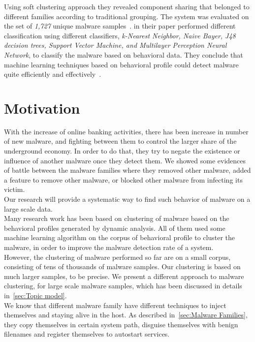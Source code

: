 Using soft clustering approach they revealed component sharing that belonged to different families according to traditional grouping.
The system was evaluated on the set of \emph{1,727} unique malware samples~\cite[]{yavvari}.
\textbf{\citeauthor{firdausi}} in their paper performed different classification using different classifiers, \emph{k-Nearest Neighbor, Naive Bayer, J48 decision trees, Support Vector Machine, and Multilayer Perception Neural Network}, to classify the malware based on behavioral data.
They conclude that machine learning techniques based on behavioral profile could detect malware quite efficiently and effectively~\cite[]{firdausi}.\\
\section{Motivation}
\label{sec:Motivation}
With the increase of online banking activities, there has been increase in number of new malware, and fighting between them to control the larger share of the underground economy.
In order to do that, they try to negate the existence or influence of another malware once they detect them.
We showed some evidences of battle between the malware families where they removed other malware, added a feature to remove other malware, or blocked other malware from infecting its victim.\\
Our research will provide a systematic way to find such behavior of malware on a large scale data.
\\
Many research work has been based on clustering of malware based on the behavioral profiles generated by dynamic analysis.
All of them used some machine learning algorithm on the corpus of behavioral profile to cluster the malware, in order to improve the malware detection rate of a system.\\
However, the clustering of malware performed so far are on a small corpus, consisting of tens of thousands of malware samples.
Our clustering is based on much larger samples, {\gettotalmalwarei{}} to be precise.
We present a different approach to malware clustering, for large scale malware samples, which has been discussed in details in~\autoref{sec:Topic model}.\\
We know that different malware family have different techniques to inject themselves and staying alive in the host.
As described in~\autoref{sec:Malware Families}, they copy themselves in certain system path, disguise themselves with benign filenames and register themselves to autostart services.
